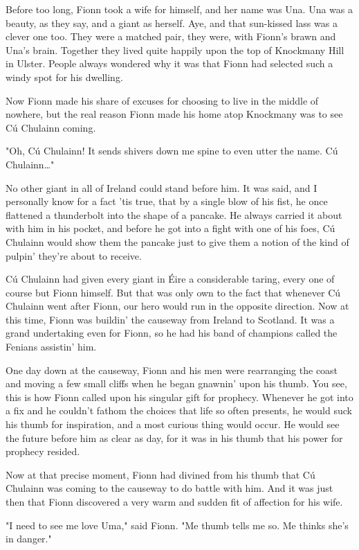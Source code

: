 Before too long, Fionn took a wife for himself, and her name was Una. Una was a beauty, as they say, and a giant as herself. Aye, and that sun-kissed lass was a clever one too. They were a matched pair, they were, with Fionn's brawn and Una's brain. Together they lived quite happily upon the top of Knockmany Hill in Ulster. People always wondered why it was that Fionn had selected such a windy spot for his dwelling.

Now Fionn made his share of excuses for choosing to live in the middle of nowhere, but the real reason Fionn made his home atop Knockmany was to see Cú Chulainn coming.

"Oh, Cú Chulainn! It sends shivers down me spine to even utter the name. Cú Chulainn\dots"

No other giant in all of Ireland could stand before him. It was said, and I personally know for a fact 'tis true, that by a single blow of his fist, he once flattened a thunderbolt into the shape of a pancake. He always carried it about with him in his pocket, and before he got into a fight with one of his foes, Cú Chulainn would show them the pancake just to give them a notion of the kind of pulpin' they're about to receive.

Cú Chulainn had given every giant in Éire a considerable taring, every one of course but Fionn himself. But that was only own to the fact that whenever Cú Chulainn went after Fionn, our hero would run in the opposite direction. Now at this time, Fionn was buildin' the causeway from Ireland to Scotland. It was a grand undertaking even for Fionn, so he had his band of champions called the Fenians assistin' him.

One day down at the causeway, Fionn and his men were rearranging the coast and moving a few small cliffs when he began gnawnin' upon his thumb. You see, this is how Fionn called upon his singular gift for prophecy. Whenever he got into a fix and he couldn't fathom the choices that life so often presents, he would suck his thumb for inspiration, and a most curious thing would occur. He would see the future before him as clear as day, for it was in his thumb that his power for prophecy resided.

Now at that precise moment, Fionn had divined from his thumb that Cú Chulainn was coming to the causeway to do battle with him. And it was just then that Fionn discovered a very warm and sudden fit of affection for his wife.

"I need to see me love Uma," said Fionn. "Me thumb tells me so. Me thinks she's in danger."

